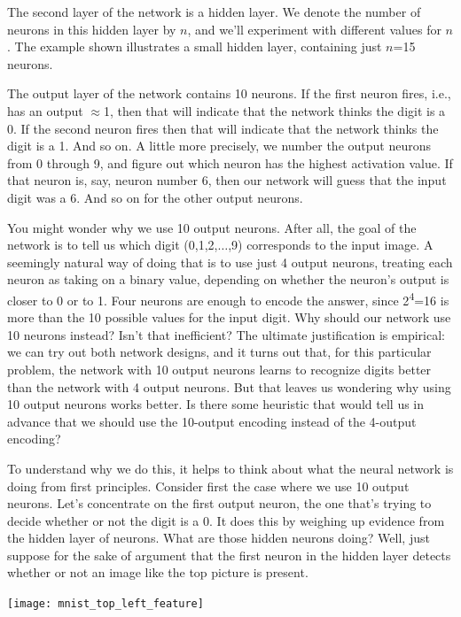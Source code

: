 The second layer of the network is a hidden layer. We denote the number of neurons in this hidden layer by $n$, and we'll experiment with different values for $n$. The example shown illustrates a small hidden layer, containing just $n$=15 neurons.

The output layer of the network contains 10 neurons. If the first neuron fires, i.e., has an output $\approx$1, then that will indicate that the network thinks the digit is a 0. If the second neuron fires then that will indicate that the network thinks the digit is a 1. And so on. A little more precisely, we number the output neurons from 0 through 9, and figure out which neuron has the highest activation value. If that neuron is, say, neuron number 6, then our network will guess that the input digit was a 6. And so on for the other output neurons.

You might wonder why we use 10 output neurons. After all, the goal of the network is to tell us which digit (0,1,2,$\ldots$,9) corresponds to the input image. A seemingly natural way of doing that is to use just 4 output neurons, treating each neuron as taking on a binary value, depending on whether the neuron's output is closer to 0 or to 1. Four neurons are enough to encode the answer, since 2\textsuperscript{4}=16 is more than the 10 possible values for the input digit. Why should our network use 10 neurons instead? Isn't that inefficient? The ultimate justification is empirical: we can try out both network designs, and it turns out that, for this particular problem, the network with 10 output neurons learns to recognize digits better than the network with 4 output neurons. But that leaves us wondering why using 10 output neurons works better. Is there some heuristic that would tell us in advance that we should use the 10-output encoding instead of the 4-output encoding?

To understand why we do this, it helps to think about what the neural network is doing from first principles. Consider first the case where we use 10 output neurons. Let's concentrate on the first output neuron, the one that's trying to decide whether or not the digit is a 0. It does this by weighing up evidence from the hidden layer of neurons. What are those hidden neurons doing? Well, just suppose for the sake of argument that the first neuron in the hidden layer detects whether or not an image like the top picture is present.

\begin{marginfigure}
\texttt{[image: mnist\_top\_left\_feature]}
\end{marginfigure}


